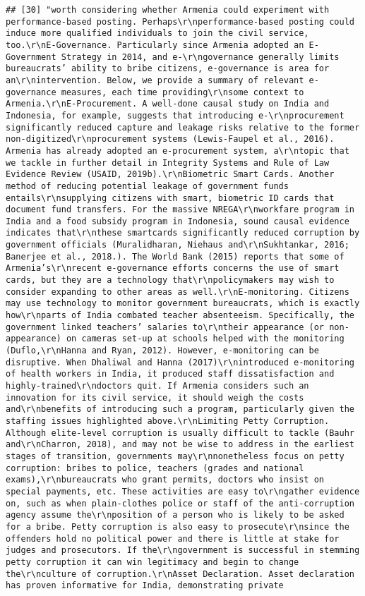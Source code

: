\documentclass[
]{article}
\begin{document}
\begin{verbatim}
## [30] "worth considering whether Armenia could experiment with performance-based posting. Perhaps\r\nperformance-based posting could induce more qualified individuals to join the civil service, too.\r\nE-Governance. Particularly since Armenia adopted an E-Government Strategy in 2014, and e-\r\ngovernance generally limits bureaucrats’ ability to bribe citizens, e-governance is area for an\r\nintervention. Below, we provide a summary of relevant e-governance measures, each time providing\r\nsome context to Armenia.\r\nE-Procurement. A well-done causal study on India and Indonesia, for example, suggests that introducing e-\r\nprocurement significantly reduced capture and leakage risks relative to the former non-digitized\r\nprocurement systems (Lewis-Faupel et al., 2016). Armenia has already adopted an e-procurement system, a\r\ntopic that we tackle in further detail in Integrity Systems and Rule of Law Evidence Review (USAID, 2019b).\r\nBiometric Smart Cards. Another method of reducing potential leakage of government funds entails\r\nsupplying citizens with smart, biometric ID cards that document fund transfers. For the massive NREGA\r\nworkfare program in India and a food subsidy program in Indonesia, sound causal evidence indicates that\r\nthese smartcards significantly reduced corruption by government officials (Muralidharan, Niehaus and\r\nSukhtankar, 2016; Banerjee et al., 2018.). The World Bank (2015) reports that some of Armenia’s\r\nrecent e-governance efforts concerns the use of smart cards, but they are a technology that\r\npolicymakers may wish to consider expanding to other areas as well.\r\nE-monitoring. Citizens may use technology to monitor government bureaucrats, which is exactly how\r\nparts of India combated teacher absenteeism. Specifically, the government linked teachers’ salaries to\r\ntheir appearance (or non-appearance) on cameras set-up at schools helped with the monitoring (Duflo,\r\nHanna and Ryan, 2012). However, e-monitoring can be disruptive. When Dhaliwal and Hanna (2017)\r\nintroduced e-monitoring of health workers in India, it produced staff dissatisfaction and highly-trained\r\ndoctors quit. If Armenia considers such an innovation for its civil service, it should weigh the costs and\r\nbenefits of introducing such a program, particularly given the staffing issues highlighted above.\r\nLimiting Petty Corruption. Although elite-level corruption is usually difficult to tackle (Bauhr and\r\nCharron, 2018), and may not be wise to address in the earliest stages of transition, governments may\r\nnonetheless focus on petty corruption: bribes to police, teachers (grades and national exams),\r\nbureaucrats who grant permits, doctors who insist on special payments, etc. These activities are easy to\r\ngather evidence on, such as when plain-clothes police or staff of the anti-corruption agency assume the\r\nposition of a person who is likely to be asked for a bribe. Petty corruption is also easy to prosecute\r\nsince the offenders hold no political power and there is little at stake for judges and prosecutors. If the\r\ngovernment is successful in stemming petty corruption it can win legitimacy and begin to change the\r\nculture of corruption.\r\nAsset Declaration. Asset declaration has proven informative for India, demonstrating private 
\end{verbatim}
\end{document}
